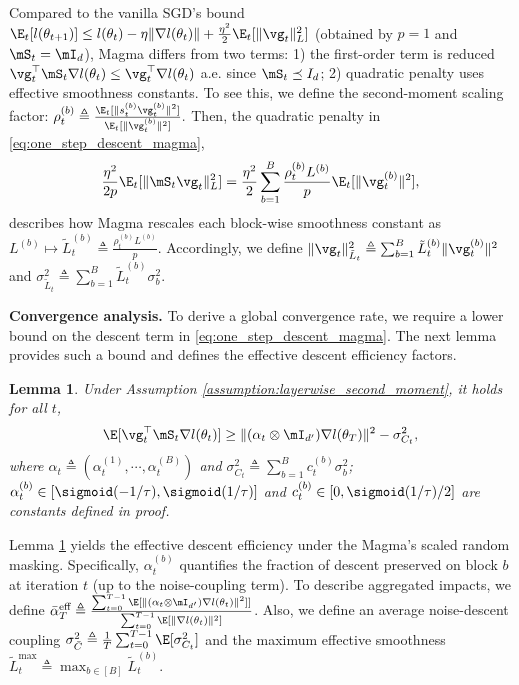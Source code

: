 \documentclass[11pt, a4paper, twocolumn, copyright, goog]{google}
\theoremstyle{plain}
\newtheorem{lemma}[theorem]{Lemma}
\theoremstyle{definition}
\theoremstyle{remark}
\begin{document}
Compared to the vanilla SGD's bound 
$\E_t[l(\theta_{t+1})]  \leq l(\theta_t) - \eta \| \nabla l(\theta_t) \| + \frac{\eta^2}{2} \E_t [\| \vg_t \|_L^2 ]$ (obtained by $p=1$ and $\mS_t = \mI_{d}$), Magma differs from two terms: 1) the first-order term is reduced $\vg_t^\top \mS_t \nabla l(\theta_t) \le  \vg_t^\top \nabla l(\theta_t)$ a.e. since $\mS_t\preceq I_d$;
2) quadratic penalty uses effective smoothness constants. To see this, we define the second-moment scaling factor: $\rho_t^{(b)} \triangleq \frac{\E_t [\| s_t^{(b)} \vg_t^{(b)} \|^2] }{ \E_t [ \| \vg_t^{(b)} \|^2]}.$
Then, the quadratic penalty in \eqref{eq:one_step_descent_magma},  
\begin{equation} \label{eq:eff_smoothness}
    \frac{\eta^2}{2p} \E_t [\| \mS_t  \vg_t \|_L^2 ] 
        = \frac{\eta^2}{2} \sum_{b=1}^{B} \frac{\rho_t^{(b)} L^{(b)}}{p} \E_t [\| \vg_t^{(b)} \|^2 ], 
\end{equation}
describes how Magma rescales each block-wise smoothness constant as $L^{(b)} \mapsto \tilde{L}_{t}^{(b)} \triangleq  \frac{\rho_t^{(b)} L^{(b)}}{p}$. 
Accordingly, we define $\| \vg_t \|_{\tilde{L}_t}^2 \triangleq \sum_{b=1}^{B} \tilde{L}_t^{(b)} \| \vg_t^{(b)} \|^2$ and $\sigma^2_{\tilde{L}_t} \triangleq \sum_{b=1}^{B} \tilde{L}_{t}^{(b)} \sigma_b^2 $.




\textbf{Convergence analysis.} 
To derive a global convergence rate, we require a lower bound on the descent term in \eqref{eq:one_step_descent_magma}. The next lemma provides such a bound and defines the effective descent efficiency factors.

\begin{lemma} \label{sup_lem:descent_lower_bound}
    Under Assumption \ref{assumption:layerwise_second_moment}, it holds for all $t$,
    \begin{equation} \label{eq:lb_descent}
        \E [\vg_t^\top \mS_t  \nabla l(\theta_t)] \geq \| (\alpha_t \otimes \mI_{d'}) \nabla l (\theta_T) \|^2 - \sigma^2_{C_t},
    \end{equation}
    where $\alpha_t \triangleq (\alpha_t^{(1)}, \cdots, \alpha_t^{(B)})$ and $\sigma^2_{C_t} \triangleq \sum_{b=1}^{B} c_t^{(b)}  \sigma^2_b$; $\alpha_t^{(b)} \in [\sigmoid(-1/\tau), \sigmoid(1/\tau)] $ and $c_t^{(b)} \in [0, \sigmoid(1/\tau) / 2]$ are constants defined in proof.
\end{lemma}


Lemma \ref{sup_lem:descent_lower_bound} yields the effective descent efficiency under the Magma's scaled random masking. Specifically, $\alpha_t^{(b)}$ quantifies the fraction of descent preserved on block $b$ at iteration $t$ (up to the noise-coupling term).
To describe aggregated impacts, we define $\bar{\alpha}_{T}^{\textrm{eff}} \triangleq \frac{\sum_{t=0}^{T-1} \E [ \| (\alpha_t \otimes \mI_{d'}) \nabla l (\theta_t) \|^2 ] ]}{\sum_{t=0}^{T-1} \E [ \| \nabla l(\theta_t) \|^2 ]}$. Also, we define an average noise-descent coupling $\sigma^2_{\bar{C}} \triangleq \frac{1}{T}\sum_{t=0}^{T-1}\E[\sigma^2_{C_t}]$ and the maximum effective smoothness $\tilde{L}_t^{\max} \triangleq \max_{b\in[B]} \tilde{L}_{t}^{(b)}$.
\end{document}
